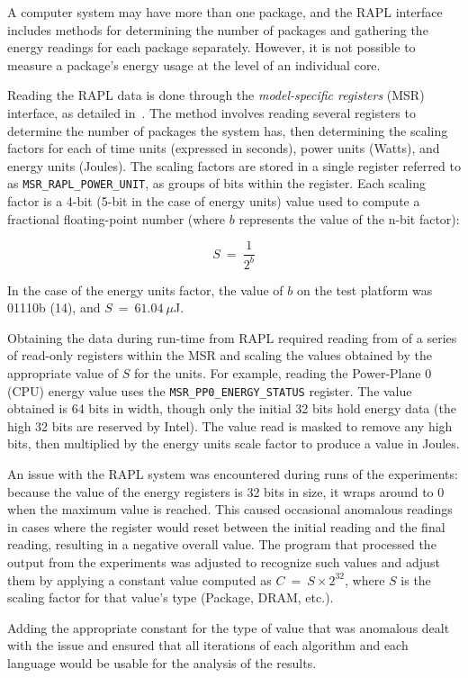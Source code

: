 A computer system may have more than one package, and the RAPL interface includes methods for determining the number of packages and gathering the energy readings for each package separately. However, it is not possible to measure a package's energy usage at the level of an individual core.

Reading the RAPL data is done through the \textit{model-specific registers} (MSR) interface, as detailed in~\cite[Chapter~14]{intel}. The method involves reading several registers to determine the number of packages the system has, then determining the scaling factors for each of time units (expressed in seconds), power units (Watts), and energy units (Joules). The scaling factors are stored in a single register referred to as \texttt{MSR\_RAPL\_POWER\_UNIT}, as groups of bits within the register. Each scaling factor is a 4-bit (5-bit in the case of energy units) value used to compute a fractional floating-point number (where $b$ represents the value of the n-bit factor):

\[S~=~\frac{1}{2^{b}}\]

In the case of the energy units factor, the value of $b$ on the test platform was 01110b (14), and $S~=~61.04~\mu$J.

Obtaining the data during run-time from RAPL required reading from of a series of read-only registers within the MSR and scaling the values obtained by the appropriate value of $S$ for the units. For example, reading the Power-Plane 0 (CPU) energy value uses the \texttt{MSR\_PP0\_ENERGY\_STATUS} register. The value obtained is 64 bits in width, though only the initial 32 bits hold energy data (the high 32 bits are reserved by Intel). The value read is masked to remove any high bits, then multiplied by the energy units scale factor to produce a value in Joules.

An issue with the RAPL system was encountered during runs of the experiments: because the value of the energy registers is 32 bits in size, it wraps around to 0 when the maximum value is reached. This caused occasional anomalous readings in cases where the register would reset between the initial reading and the final reading, resulting in a negative overall value. The program that processed the output from the experiments was adjusted to recognize such values and adjust them by applying a constant value computed as $C~=~S \times 2^{32}$, where $S$ is the scaling factor for that value's type (Package, DRAM, etc.).

Adding the appropriate constant for the type of value that was anomalous dealt with the issue and ensured that all iterations of each algorithm and each language would be usable for the analysis of the results.


